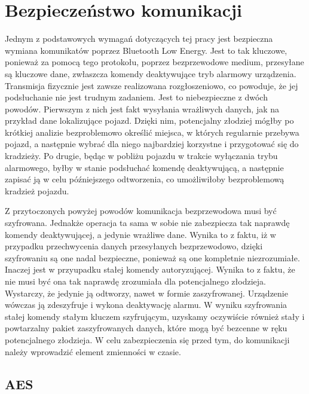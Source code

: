 \chapter{Bezpieczeństwo komunikacji}
\label{ch:communication security}

Jednym z podstawowych wymagań dotyczących tej pracy jest bezpieczna wymiana komunikatów poprzez Bluetooth Low Energy. Jest to tak kluczowe, ponieważ za pomocą tego protokołu, poprzez bezprzewodowe medium, przesyłane są kluczowe dane, zwłaszcza komendy deaktywujące tryb alarmowy urządzenia. Transmisja fizycznie jest zawsze realizowana rozgłoszeniowo, co powoduje, że jej podsłuchanie nie jest trudnym zadaniem. Jest to niebezpieczne z dwóch powodów. Pierwszym z nich jest fakt wysyłania wrażliwych danych, jak na przykład dane lokalizujące pojazd. Dzięki nim, potencjalny złodziej mógłby po krótkiej analizie bezproblemowo określić miejsca, w których regularnie przebywa pojazd, a następnie wybrać dla niego najbardziej korzystne i przygotować się do kradzieży. Po drugie, będąc w pobliżu pojazdu w trakcie wyłączania trybu alarmowego, byłby w stanie podsłuchać komendę deaktywującą, a następnie zapisać ją w celu późniejszego odtworzenia, co umożliwiłoby bezproblemową kradzież pojazdu.

Z przytoczonych powyżej powodów komunikacja bezprzewodowa musi być szyfrowana. Jednakże operacja ta sama w sobie nie zabezpiecza tak naprawdę komendy deaktywującej, a jedynie wrażliwe dane. Wynika to z faktu, iż w przypadku przechwycenia danych przesyłanych bezprzewodowo, dzięki szyfrowaniu są one nadal bezpieczne, ponieważ są one kompletnie niezrozumiałe. Inaczej jest w przyupadku stałej komendy autoryzującej. Wynika to z faktu, że nie musi być ona tak naprawdę zrozumiała dla potencjalnego złodzieja. Wystarczy, że jedynie ją odtworzy, nawet w formie zaszyfrowanej. Urządzenie wówczas ją zdeszyfruje i wykona deaktywację alarmu. W wyniku szyfrowania stałej komendy stałym kluczem szyfrującym, uzyskamy oczywiście również stały i powtarzalny pakiet zaszyfrowanych danych, które mogą być bezcenne w ręku potencjalnego złodzieja. W celu zabezpieczenia się przed tym, do komunikacji należy wprowadzić element zmienności w czasie.  

\section{AES}

